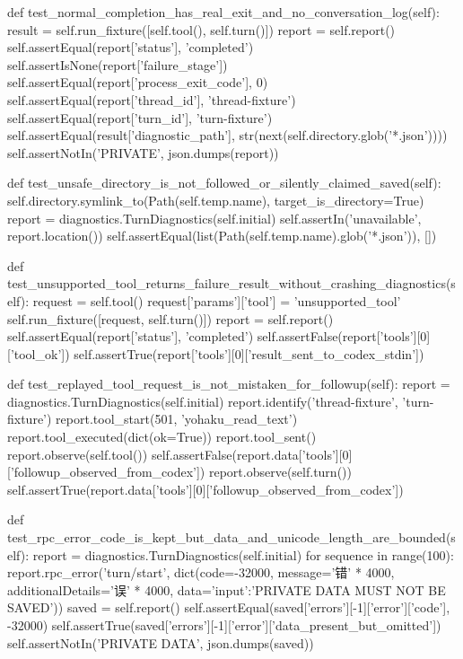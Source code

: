     def test_normal_completion_has_real_exit_and_no_conversation_log(self):
        result = self.run_fixture([self.tool(), self.turn()])
        report = self.report()
        self.assertEqual(report['status'], 'completed')
        self.assertIsNone(report['failure_stage'])
        self.assertEqual(report['process_exit_code'], 0)
        self.assertEqual(report['thread_id'], 'thread-fixture')
        self.assertEqual(report['turn_id'], 'turn-fixture')
        self.assertEqual(result['diagnostic_path'], str(next(self.directory.glob('*.json'))))
        self.assertNotIn('PRIVATE', json.dumps(report))

    def test_unsafe_directory_is_not_followed_or_silently_claimed_saved(self):
        self.directory.symlink_to(Path(self.temp.name), target_is_directory=True)
        report = diagnostics.TurnDiagnostics(self.initial)
        self.assertIn('unavailable', report.location())
        self.assertEqual(list(Path(self.temp.name).glob('*.json')), [])

    def test_unsupported_tool_returns_failure_result_without_crashing_diagnostics(self):
        request = self.tool()
        request['params']['tool'] = 'unsupported_tool'
        self.run_fixture([request, self.turn()])
        report = self.report()
        self.assertEqual(report['status'], 'completed')
        self.assertFalse(report['tools'][0]['tool_ok'])
        self.assertTrue(report['tools'][0]['result_sent_to_codex_stdin'])

    def test_replayed_tool_request_is_not_mistaken_for_followup(self):
        report = diagnostics.TurnDiagnostics(self.initial)
        report.identify('thread-fixture', 'turn-fixture')
        report.tool_start(501, 'yohaku_read_text')
        report.tool_executed(dict(ok=True))
        report.tool_sent()
        report.observe(self.tool())
        self.assertFalse(report.data['tools'][0]['followup_observed_from_codex'])
        report.observe(self.turn())
        self.assertTrue(report.data['tools'][0]['followup_observed_from_codex'])

    def test_rpc_error_code_is_kept_but_data_and_unicode_length_are_bounded(self):
        report = diagnostics.TurnDiagnostics(self.initial)
        for sequence in range(100):
            report.rpc_error('turn/start', dict(code=-32000, message='错' * 4000,
                            additionalDetails='误' * 4000, data={'input':'PRIVATE DATA MUST NOT BE SAVED'}))
        saved = self.report()
        self.assertEqual(saved['errors'][-1]['error']['code'], -32000)
        self.assertTrue(saved['errors'][-1]['error']['data_present_but_omitted'])
        self.assertNotIn('PRIVATE DATA', json.dumps(saved))

